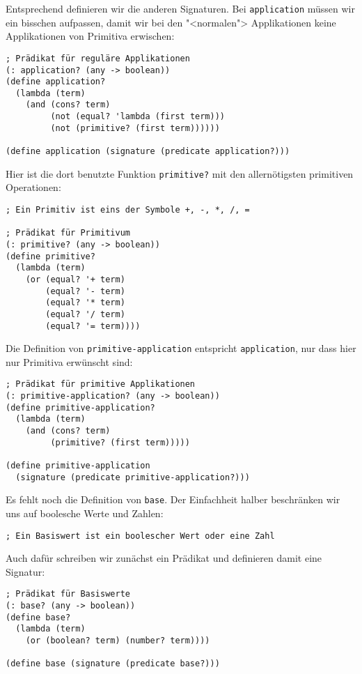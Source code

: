 %
Entsprechend definieren wir die anderen Signaturen.  Bei
\lstinline{application} müssen wir ein bisschen aufpassen, damit wir
bei den "<normalen"> Applikationen keine Applikationen von Primitiva
erwischen:
%
\begin{lstlisting}
; Prädikat für reguläre Applikationen
(: application? (any -> boolean))
(define application?
  (lambda (term)
    (and (cons? term)
         (not (equal? 'lambda (first term)))
         (not (primitive? (first term))))))

(define application (signature (predicate application?)))
\end{lstlisting}
%
Hier ist die dort benutzte Funktion \lstinline{primitive?} mit den
allernötigsten primitiven Operationen:\label{page:primitivep}
%
\begin{lstlisting}
; Ein Primitiv ist eins der Symbole +, -, *, /, =

; Prädikat für Primitivum
(: primitive? (any -> boolean))
(define primitive?
  (lambda (term)
    (or (equal? '+ term)
        (equal? '- term)
        (equal? '* term)
        (equal? '/ term)
        (equal? '= term))))
\end{lstlisting}
%
Die Definition von \lstinline{primitive-application} entspricht
\lstinline{application}, nur dass hier nur Primitiva erwünscht sind:
%
\begin{lstlisting}
; Prädikat für primitive Applikationen
(: primitive-application? (any -> boolean))
(define primitive-application?
  (lambda (term)
    (and (cons? term)
         (primitive? (first term)))))

(define primitive-application 
  (signature (predicate primitive-application?)))
\end{lstlisting}
%
Es fehlt noch die Definition von \lstinline{base}.  Der Einfachheit
halber beschränken wir uns auf boolesche Werte und Zahlen:\label{page:basiswert}
%
\begin{lstlisting}
; Ein Basiswert ist ein boolescher Wert oder eine Zahl
\end{lstlisting}
%
Auch dafür schreiben wir zunächst ein Prädikat und definieren damit
eine Signatur:
%
\begin{lstlisting}
; Prädikat für Basiswerte
(: base? (any -> boolean))
(define base?
  (lambda (term)
    (or (boolean? term) (number? term))))

(define base (signature (predicate base?)))
\end{lstlisting}

